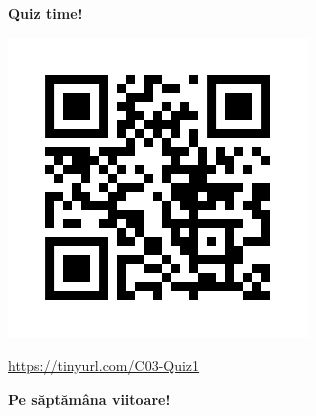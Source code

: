 \documentclass[xcolor=pdftex,romanian,colorlinks]{beamer}
\begin{document}
%
%
%
%
%
\begin{frame}
  \vfill
  \centering

\textbf{\large \alert{Quiz time!}}

\includegraphics[scale=.35]{../Quiz/C03-Q1.png}

 \url{https://tinyurl.com/C03-Quiz1}
  \vfill
\end{frame}

\begin{frame}
  \vfill
  \centering

\textbf{Pe săptămâna viitoare!}

  \vfill
\end{frame}
\end{document}
